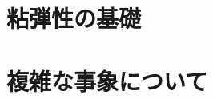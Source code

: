 \documentclass[uplatex,dvipdfmx,a4paper,11pt]{jsreport}
\begin{document}
\maketitle

\setcounter{tocdepth}{2}
\tableofcontents



\chapter{粘弾性の基礎}


\chapter{複雑な事象について}


% 




\printindex
\end{document}
